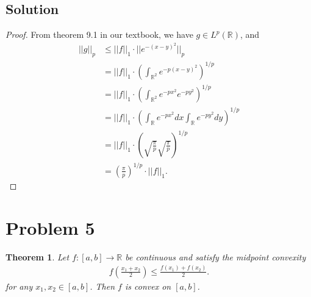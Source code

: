 \documentclass[10pt,a4paper]{article}
\theoremstyle{theorem}
\newtheorem{theorem}{Theorem}
\theoremstyle{definition}
\begin{document}
\subsection*{Solution}
\begin{proof}
From theorem 9.1 in our textbook, we have $g \in L^p(\mathbb{R})$, and
\begin{align*}
||g||_p &\leq ||f||_1 \cdot ||e^{-(x - y)^2}||_p\\
&= ||f||_1 \cdot \left( \int_{\mathbb{R}^2} e^{-p(x - y)^2} \right)^{1/p}\\
&= ||f||_1 \cdot \left( \int_{\mathbb{R}^2} e^{-px^2} e^{-py^2} \right)^{1/p}\\
&= ||f||_1 \cdot \left( \int_\mathbb{R} e^{-px^2} dx  \int_\mathbb{R} e^{-py^2} dy \right)^{1/p}\\
&= ||f||_1 \cdot \left( \sqrt{\frac{\pi}{p}}  \sqrt{\frac{\pi}{p}}  \right)^{1/p}\\
&= \left( \frac{\pi}{p} \right)^{1/p} \cdot ||f||_1.
\end{align*}
\end{proof}

\section*{Problem 5}
\begin{theorem}
Let $f:[a, b] \to \mathbb{R}$ be continuous and satisfy the midpoint convexity
\begin{align*}
f \left(\frac{x_1 + x_2}{2} \right) \leq \frac{f(x_1) + f(x_2)}{2}.
\end{align*}
for any $x_1, x_2 \in [a, b]$. Then $f$ is convex on $[a, b]$.
\end{theorem}
\end{document}
